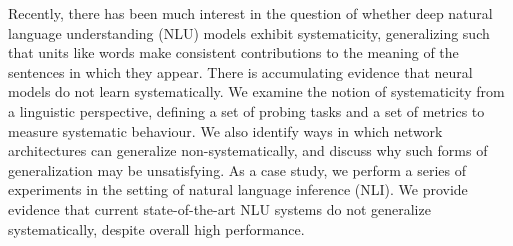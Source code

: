 Recently, there has been much interest in the question of whether deep natural language understanding (NLU) models exhibit systematicity, generalizing such that units like words make consistent contributions to the meaning of the sentences in which they appear. There is accumulating evidence that neural models do not learn systematically. We examine the notion of  systematicity from a linguistic perspective, defining a set of probing tasks and a set of metrics to measure systematic behaviour. We also identify ways in which network architectures can generalize non-systematically, and discuss why such forms of generalization may be unsatisfying. As a case study, we perform a series of experiments in the setting of natural language inference (NLI). We provide evidence that current state-of-the-art NLU systems do not generalize systematically, despite overall high performance.
